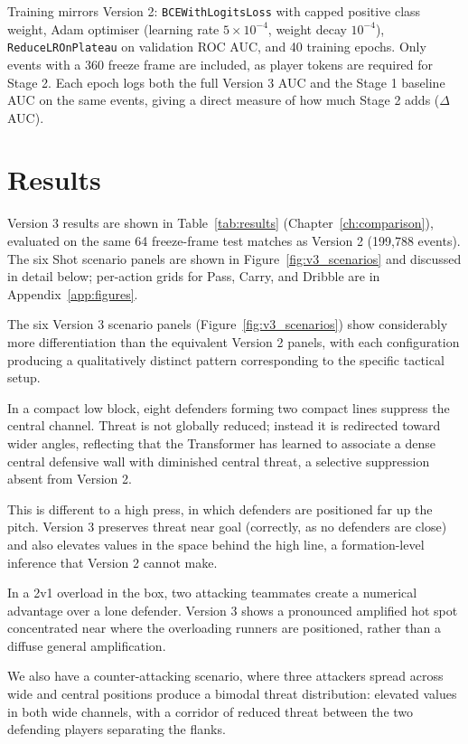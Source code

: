 Training mirrors Version 2: \texttt{BCEWithLogitsLoss} with capped positive class weight, Adam optimiser (learning rate $5 \times 10^{-4}$, weight decay $10^{-4}$), \texttt{ReduceLROnPlateau} on validation ROC AUC, and 40 training epochs. Only events with a 360 freeze frame are included, as player tokens are required for Stage 2. Each epoch logs both the full Version 3 AUC and the Stage 1 baseline AUC on the same events, giving a direct measure of how much Stage 2 adds ($\Delta$AUC).

\section{Results}

Version 3 results are shown in Table~\ref{tab:results} (Chapter~\ref{ch:comparison}), evaluated on the same 64 freeze-frame test matches as Version 2 (199,788 events). The six Shot scenario panels are shown in Figure~\ref{fig:v3_scenarios} and discussed in detail below; per-action grids for Pass, Carry, and Dribble are in Appendix~\ref{app:figures}.

The six Version 3 scenario panels (Figure~\ref{fig:v3_scenarios}) show considerably more differentiation than the equivalent Version 2 panels, with each configuration producing a qualitatively distinct pattern corresponding to the specific tactical setup.

In a compact low block, eight defenders forming two compact lines suppress the central channel. Threat is not globally reduced; instead it is redirected toward wider angles, reflecting that the Transformer has learned to associate a dense central defensive wall with diminished central threat, a selective suppression absent from Version 2.

This is different to a high press, in which defenders are positioned far up the pitch. Version 3 preserves threat near goal (correctly, as no defenders are close) and also elevates values in the space behind the high line, a formation-level inference that Version 2 cannot make.

In a 2v1 overload in the box, two attacking teammates create a numerical advantage over a lone defender. Version 3 shows a pronounced amplified hot spot concentrated near where the overloading runners are positioned, rather than a diffuse general amplification.

We also have a counter-attacking scenario, where three attackers spread across wide and central positions produce a bimodal threat distribution: elevated values in both wide channels, with a corridor of reduced threat between the two defending players separating the flanks.

